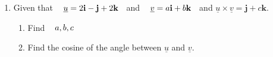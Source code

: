 \documentclass[11pt,a4paper]{article}
\begin{document}
\begin{enumerate}
\item Given that $\hspace{0.3cm} \underline{u} = 2\textbf{i} - \textbf{j} + 2\textbf{k}\hspace{0.2cm}$ and $\hspace{0.3cm} \underline{v} = a\textbf{i}  + b\textbf{k}\hspace{0.2cm}$ and $\underline{u}\times \underline{v} = \textbf{j} + c\textbf{k}$.
\begin{enumerate}
      \item Find $\hspace{0.3cm} a, b, c$
      
      \item Find the cosine of the angle between $\underline{u}$ and $\underline{v}$.\\\\
\end{enumerate}
\end{enumerate}
\end{document}
